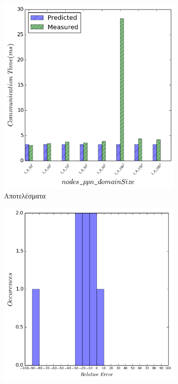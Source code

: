 \begin{figure}[H]
    \centering
    \captionsetup{justification=centering,margin=0cm,font=footnotesize}
    \begin{subfigure}[b]{0.47\textwidth}
        \includegraphics[width=\textwidth]{./images/coll_UMA/res.png}
        \caption{Αποτελέσματα}
    \end{subfigure}
    \quad %
    \begin{subfigure}[b]{0.47\textwidth}
        \includegraphics[width=\textwidth]{./images/coll_UMA/err_dist.png}

\end{subfigure}
\end{figure}
